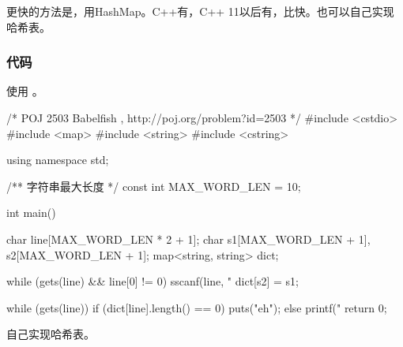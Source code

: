 更快的方法是，用HashMap。C++有，C++ 11以后有，比快。也可以自己实现哈希表。


\subsubsection{代码}
使用  。

\begin{Codex}[label=babelfish_map.cpp]
/* POJ 2503 Babelfish , http://poj.org/problem?id=2503 */
#include <cstdio>
#include <map>
#include <string>
#include <cstring>

using namespace std;

/** 字符串最大长度 */
const int MAX_WORD_LEN = 10;

int main() {
    char line[MAX_WORD_LEN * 2 + 1];
    char s1[MAX_WORD_LEN + 1], s2[MAX_WORD_LEN + 1];
    map<string, string> dict;

    while (gets(line) && line[0] != 0) {
        sscanf(line, "%
        dict[s2] = s1;
    }

    while (gets(line)) {
        if (dict[line].length() == 0) puts("eh");
        else printf("%
    }
    return 0;
}
\end{Codex}


自己实现哈希表。

